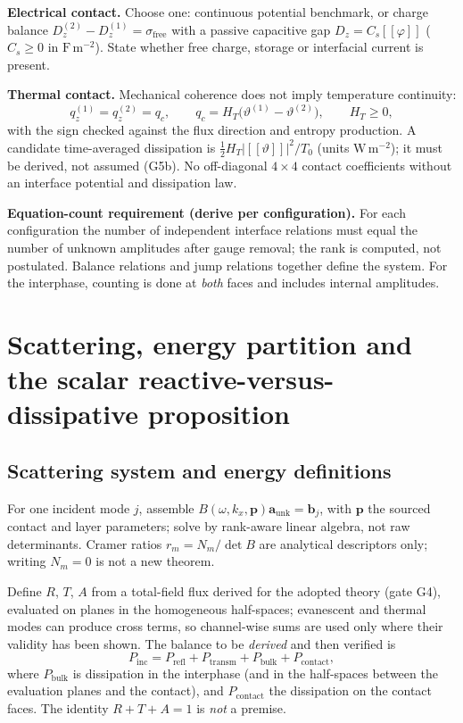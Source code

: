 \documentclass[11pt]{article}
\newcommand{\jj}{[\![}
\newcommand{\kk}{]\!]}
\begin{document}
\textbf{Electrical contact.} Choose one: continuous potential benchmark, or
charge balance $D_z^{(2)}-D_z^{(1)}=\sigma_{\text{free}}$ with a passive
capacitive gap $D_z = C_s\jj\varphi\kk$ ($C_s\ge0$ in $\mathrm{F\,m^{-2}}$).
State whether free charge, storage or interfacial current is present.

\textbf{Thermal contact.} Mechanical coherence does not imply temperature
continuity:
\begin{equation}
  q_z^{(1)} = q_z^{(2)} = q_c, \qquad
  q_c = H_T\big(\vartheta^{(1)}-\vartheta^{(2)}\big), \qquad H_T\ge0, \tag{7}
\end{equation}
with the sign checked against the flux direction and entropy production. A
candidate time-averaged dissipation is $\tfrac12 H_T\lvert\jj\vartheta\kk\rvert^2/T_0$
(units $\mathrm{W\,m^{-2}}$); it must be derived, not assumed (G5b). No
off-diagonal $4\times4$ contact coefficients without an interface potential and
dissipation law.

\textbf{Equation-count requirement (derive per configuration).} For each
configuration the number of independent interface relations must equal the number
of unknown amplitudes after gauge removal; the rank is computed, not postulated.
Balance relations and jump relations together define the system. For the
interphase, counting is done at \emph{both} faces and includes internal
amplitudes.

\section{Scattering, energy partition and the scalar
reactive-versus-dissipative proposition}

\subsection{Scattering system and energy definitions}

For one incident mode $j$, assemble $B(\omega,k_x,\bm{p})\bm{a}_{\text{unk}}=\bm{b}_j$,
with $\bm{p}$ the sourced contact and layer parameters; solve by rank-aware linear
algebra, not raw determinants. Cramer ratios $r_m=N_m/\det B$ are analytical
descriptors only; writing $N_m=0$ is not a new theorem.

Define $R$, $T$, $A$ from a total-field flux derived for the adopted theory (gate
G4), evaluated on planes in the homogeneous half-spaces; evanescent and thermal
modes can produce cross terms, so channel-wise sums are used only where their
validity has been shown. The balance to be \emph{derived} and then verified is
\begin{equation}
  P_{\text{inc}} = P_{\text{refl}} + P_{\text{transm}} + P_{\text{bulk}}
  + P_{\text{contact}}, \tag{8}
\end{equation}
where $P_{\text{bulk}}$ is dissipation in the interphase (and in the half-spaces
between the evaluation planes and the contact), and $P_{\text{contact}}$ the
dissipation on the contact faces. The identity $R+T+A=1$ is \emph{not} a premise.
\end{document}
